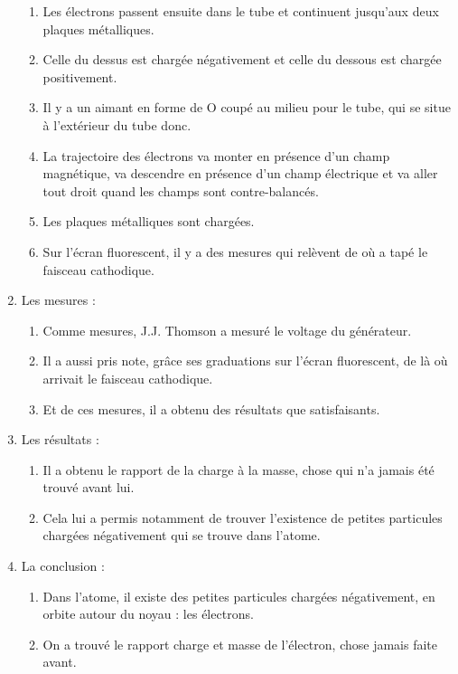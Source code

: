 \documentclass[../main.tex]{subfiles}
\begin{document}
\begin{enumerate}
\begin{enumerate}
    \item Les électrons passent ensuite dans le tube et continuent jusqu'aux deux plaques métalliques.
    \item Celle du dessus est chargée négativement et celle du dessous est chargée positivement.
    \item Il y a un aimant en forme de O coupé au milieu pour le tube, qui se situe à l'extérieur du tube donc.
    \item La trajectoire des électrons va monter en présence d'un champ magnétique, va descendre en présence d'un champ électrique et  va aller tout droit quand les champs sont contre-balancés. 
    \item Les plaques métalliques sont chargées.
    \item Sur l'écran fluorescent, il y a des mesures qui relèvent de où a tapé le faisceau cathodique. 
    \end{enumerate}
    \item Les mesures :
    \begin{enumerate}
        \item Comme mesures, J.J. Thomson a mesuré le voltage du générateur.
        \item Il a aussi pris note, grâce ses graduations sur l'écran fluorescent, de là où arrivait le faisceau cathodique.
        \item Et de ces mesures, il a obtenu des résultats que satisfaisants.
    \end{enumerate}
    \item Les résultats :
    \begin{enumerate}
        \item Il a obtenu le rapport de la charge à la masse, chose qui n'a jamais été trouvé avant lui.
        \item Cela lui a permis notamment de trouver l'existence de petites particules chargées négativement qui se trouve dans l'atome. 
    \end{enumerate}
    \item La conclusion :
    \begin{enumerate}
        \item Dans l'atome, il existe des petites particules chargées négativement, en orbite autour du noyau : les électrons.
        \item On a trouvé le rapport charge et masse de l'électron, chose jamais faite avant.
    \end{enumerate}
\end{enumerate}
\end{document}

